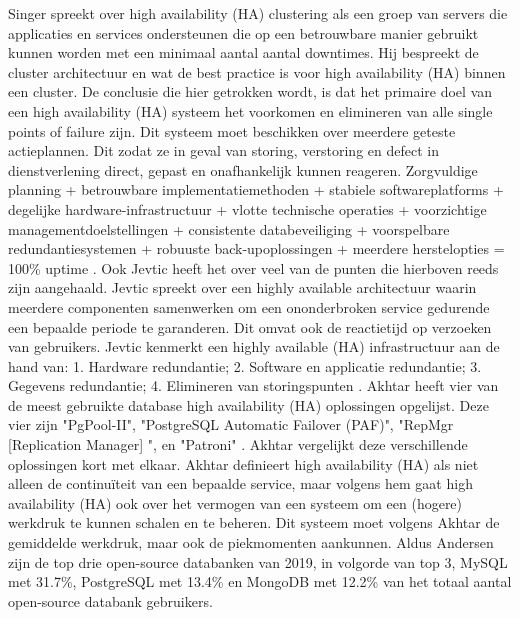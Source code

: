 Singer spreekt over high availability (HA) clustering als een groep van servers die applicaties en services ondersteunen die op een betrouwbare manier gebruikt kunnen worden met een minimaal aantal aantal downtimes. Hij bespreekt de cluster architectuur en wat de best practice is voor high availability (HA) binnen een cluster. De conclusie die hier getrokken wordt, is dat het primaire doel van een high availability (HA) systeem het voorkomen en elimineren van alle single points of failure zijn. Dit systeem moet beschikken over meerdere geteste actieplannen. Dit zodat ze in geval van storing, verstoring en defect in dienstverlening direct, gepast en onafhankelijk kunnen reageren. 
Zorgvuldige planning + betrouwbare implementatiemethoden + stabiele softwareplatforms + degelijke hardware-infrastructuur + vlotte technische operaties + voorzichtige managementdoelstellingen + consistente databeveiliging + voorspelbare redundantiesystemen + robuuste back-upoplossingen + meerdere herstelopties = 100\% uptime \autocite{Singer2020}.
Ook Jevtic heeft het over veel van de punten die hierboven reeds zijn aangehaald. Jevtic spreekt over een highly available architectuur waarin meerdere componenten samenwerken om een ononderbroken service gedurende een bepaalde periode te garanderen. Dit omvat ook de reactietijd op verzoeken van gebruikers. Jevtic kenmerkt een  highly available (HA) infrastructuur aan de hand van: 1. Hardware redundantie; 2. Software en applicatie redundantie; 3. Gegevens redundantie; 4. Elimineren van storingspunten \autocite{Jevtic2018}.
Akhtar heeft vier van de meest gebruikte database high availability (HA) oplossingen opgelijst. Deze vier zijn "PgPool-II", "PostgreSQL Automatic Failover (PAF)", "RepMgr [Replication Manager] ", en "Patroni" \autocite{Akhtar2020}. Akhtar vergelijkt deze verschillende oplossingen kort met elkaar. Akhtar definieert high availability (HA) als niet alleen de continuïteit van een bepaalde service, maar volgens hem gaat high availability (HA) ook over het vermogen van een systeem om een (hogere) werkdruk te kunnen schalen en te beheren. Dit systeem moet volgens Akhtar de gemiddelde werkdruk, maar ook de piekmomenten aankunnen.
Aldus Andersen zijn de top drie open-source databanken van 2019, in volgorde van top 3, MySQL met 31.7\%, PostgreSQL met 13.4\% en MongoDB met 12.2\% \autocite{Anderson2020} van het totaal aantal open-source databank gebruikers.



